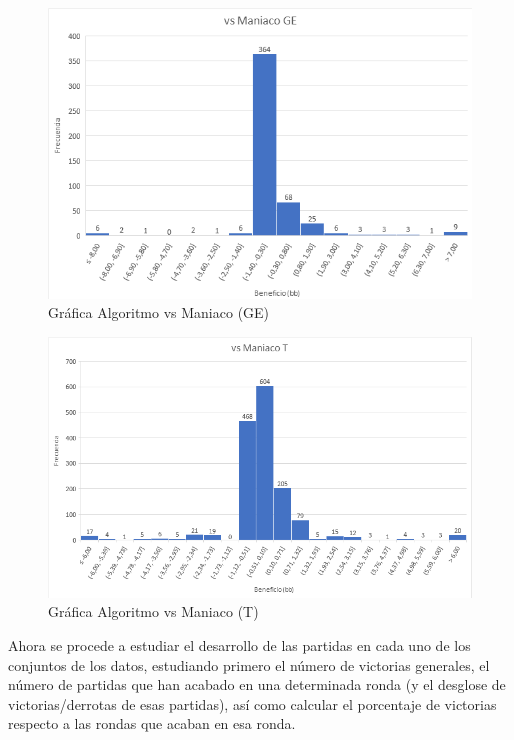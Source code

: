 \begin{figure}[h]
\centering
\includegraphics[width=1\textwidth]{figuras/AvMGE.png}   
\caption{Gráfica Algoritmo vs Maniaco (GE)}
\label{fig:AvMGE}
\end{figure}

\begin{figure}[h]
\centering
\includegraphics[width=1\textwidth]{figuras/AvMT.png}   
\caption{Gráfica Algoritmo vs Maniaco (T)}
\label{fig:AvMGT}
\end{figure}

\vspace{5mm} %

Ahora se procede a estudiar el desarrollo de las partidas en cada uno de los conjuntos de los datos, estudiando primero el número de victorias generales, el número de partidas que han acabado en una determinada ronda (y el desglose de victorias/derrotas de esas partidas), así como calcular el porcentaje de victorias respecto a las rondas que acaban en esa ronda.

